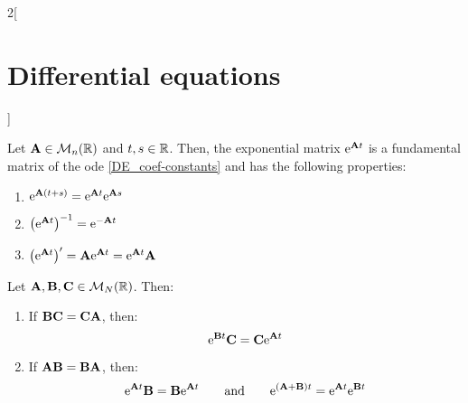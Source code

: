 \documentclass[../../../main.tex]{subfiles}
\begin{document}
\begin{multicols}{2}[\section{Differential equations}]
\begin{lemma}
  \end{lemma}
  \begin{prop}
    Let $\boldsymbol{\mathrm{A}}\in\mathcal{M}_n(\mathbb{R})$ and $t,s\in \mathbb{R}$. Then, the exponential matrix $\mathrm{e}^{\boldsymbol{\mathrm{A}}t}$ is a fundamental matrix of the ode \eqref{DE_coef-constants} and has the following properties:
    \begin{enumerate}
      \item $\mathrm{e}^{\boldsymbol{\mathrm{A}}(t+s)}=\mathrm{e}^{\boldsymbol{\mathrm{A}}t}\mathrm{e}^{\boldsymbol{\mathrm{A}}s}$
      \item ${\left(\mathrm{e}^{\boldsymbol{\mathrm{A}}t}\right)}^{-1}=\mathrm{e}^{-\boldsymbol{\mathrm{A}}t}$
      \item $\left(\mathrm{e}^{\boldsymbol{\mathrm{A}}t}\right)'=\boldsymbol{\mathrm{A}}\mathrm{e}^{\boldsymbol{\mathrm{A}}t}=\mathrm{e}^{\boldsymbol{\mathrm{A}}t}\boldsymbol{\mathrm{A}}$
    \end{enumerate}
  \end{prop}
  \begin{lemma}
    Let $\boldsymbol{\mathrm{A}},\boldsymbol{\mathrm{B}},\boldsymbol{\mathrm{C}}\in\mathcal{M}_N(\mathbb{R})$. Then:
    \begin{enumerate}
      \item If $\boldsymbol{\mathrm{B}}\boldsymbol{\mathrm{C}}=\boldsymbol{\mathrm{C}}\boldsymbol{\mathrm{A}}$, then: $$\mathrm{e}^{\boldsymbol{\mathrm{B}}t}\boldsymbol{\mathrm{C}}=\boldsymbol{\mathrm{C}}\mathrm{e}^{\boldsymbol{\mathrm{A}}t}$$
      \item If $\boldsymbol{\mathrm{A}}\boldsymbol{\mathrm{B}}=\boldsymbol{\mathrm{B}}\boldsymbol{\mathrm{A}}$, then: $$\mathrm{e}^{\boldsymbol{\mathrm{A}}t}\boldsymbol{\mathrm{B}}=\boldsymbol{\mathrm{B}}\mathrm{e}^{\boldsymbol{\mathrm{A}}t}\qquad\text{and}\qquad\mathrm{e}^{(\boldsymbol{\mathrm{A}}+\boldsymbol{\mathrm{B}})t}=\mathrm{e}^{\boldsymbol{\mathrm{A}}t}\mathrm{e}^{\boldsymbol{\mathrm{B}}t}$$
    \end{enumerate}
  \end{lemma}
\end{multicols}
\end{document}
